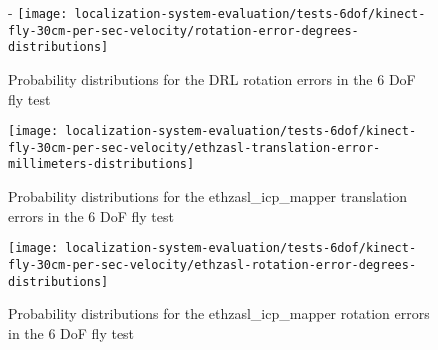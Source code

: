 \begin{figure}[H]
	\centering
-	\texttt{[image: localization-system-evaluation/tests-6dof/kinect-fly-30cm-per-sec-velocity/rotation-error-degrees-distributions]}
	\caption{Probability distributions for the DRL rotation errors in the 6 DoF fly test}
	\label{fig:localization-system-evaluation_kinect-fly-30cm-per-sec-velocity-rotation-error}
\end{figure}

\begin{figure}[H]
	\centering
	\texttt{[image: localization-system-evaluation/tests-6dof/kinect-fly-30cm-per-sec-velocity/ethzasl-translation-error-millimeters-distributions]}
	\caption{Probability distributions for the ethzasl\_icp\_mapper translation errors in the 6 DoF fly test}
	\label{fig:localization-system-evaluation_kinect-fly-30cm-per-sec-velocity-translation-error-asl}
\end{figure}

\begin{figure}[H]
	\centering
	\texttt{[image: localization-system-evaluation/tests-6dof/kinect-fly-30cm-per-sec-velocity/ethzasl-rotation-error-degrees-distributions]}
	\caption{Probability distributions for the ethzasl\_icp\_mapper rotation errors in the 6 DoF fly test}
	\label{fig:localization-system-evaluation_kinect-fly-30cm-per-sec-velocity-rotation-error-asl}
\end{figure}


